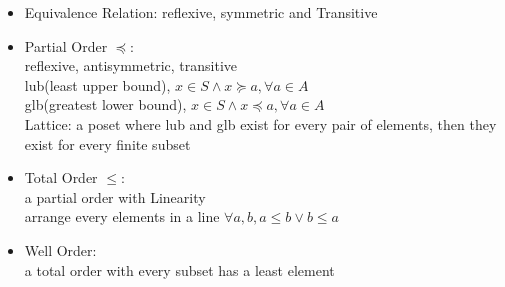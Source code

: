 \documentclass[11pt, a4paper]{article}
\begin{document}
\begin{multicols}{3}
\begin{enumerate}
            \begin{itemize}
                \item Equivalence Relation: reflexive, symmetric and Transitive
                \item Partial Order $\preceq$:\\
                    reflexive, antisymmetric, transitive\\
                    lub(least upper bound), $x \in S \land x \succeq a, \forall a \in A$\\
                    glb(greatest lower bound), $x \in S \land x \preceq a, \forall a \in A$\\
                    Lattice: a poset where lub and glb exist for every pair of elements, then they exist for every finite subset
                \item Total Order $\leq$: \\
                    a partial order with Linearity\\
                    arrange every elements in a line $\forall a,b, a \leq b \lor b \leq a$
                \item Well Order: \\
                    a total order with every subset has a least element
            \end{itemize}
        \end{enumerate}


\end{multicols}
\end{document}
